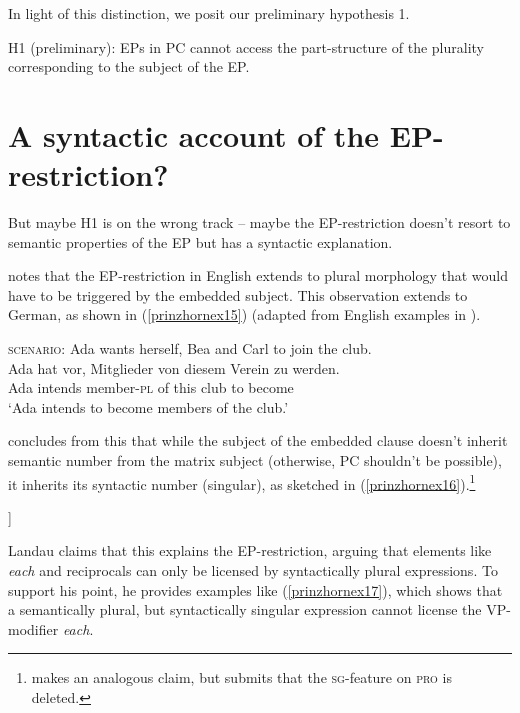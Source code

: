 \documentclass[output=paper,colorlinks,citecolor=brown,
]{langscibook}
\begin{document}
In light of this distinction, we posit our preliminary hypothesis 1.


\ea H1 (preliminary): EPs in PC cannot access the part-structure of the plurality corresponding to the subject of the EP.\label{prinzhornex14}
\z 




\section{A syntactic account of the EP-restriction?}\label{prinzhornsec:3}

But maybe H1 is on the wrong track -- maybe the EP-restriction doesn't resort to semantic properties of the EP but has a syntactic explanation. 

\citet{Landau:2000} notes that the EP-restriction in English extends to plural morphology that would have to be triggered by  the embedded subject. This observation extends to German, as shown in (\ref{prinzhornex15}) (adapted from English examples in \citealt{Landau:2000}).


\ea \label{prinzhornex15}
\textsc{scenario:} Ada wants herself, Bea and Carl to join the club.\\
\gll {*} {Ada} {hat vor}, {Mitglieder} {von} {diesem} {Verein} {zu} {werden}.\\
   {} Ada intends  member-\textsc{pl} of this club to become\\
   \glt\phantom{*} `Ada intends to become members of the club.'
\z



\citet{Landau:2000} concludes from this that while the subject of the embedded clause doesn't inherit semantic number from the matrix subject (otherwise, PC shouldn't be possible), it inherits its syntactic number (singular), as sketched in (\ref{prinzhornex16}).\footnote{\citet{Pearson:2016} makes an analogous claim, but submits that the \textsc{sg}-feature on \textsc{pro} is deleted.}

\ea [Ada$_{sg}$ plant [\textsc{pro}$_{sg}$ Mitglieder von diesem Verein zu werden]]\label{prinzhornex16}
\z

Landau claims that this explains the EP-restriction, arguing that elements like \textit{each} and reciprocals can only be licensed by syntactically plural expressions. To support his point, he provides  examples like (\ref{prinzhornex17}), which shows that a semantically plural, but syntactically singular expression cannot license the VP-modifier \textit{each}.
\end{document}
